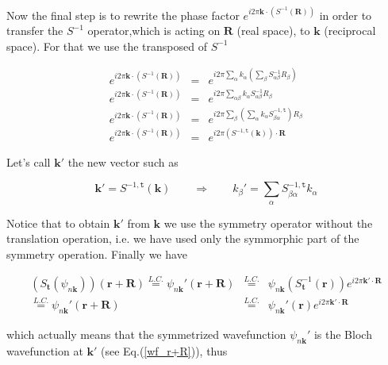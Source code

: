 \documentclass[a4paper,12pt]{report}
\begin{document}
Now the final step is to rewrite the phase factor $e^{i2\pi\mathbf{k}\cdotp\left(S^{-1}\left(\mathbf{R}\right)\right)}$ in order to transfer the $S^{-1}$ operator,which is acting on $\mathbf{R}$ (real space), to $\mathbf{k}$ (reciprocal space). For that we use the transposed of $S^{-1}$

\begin{eqnarray}
e^{i2\pi\mathbf{k}\cdotp\left(S^{-1}\left(\mathbf{R}\right)\right) } &=& e^{i2\pi \sum_{\alpha}k_{\alpha} \left(\sum_{\beta}S^{-1}_{\alpha\beta} R_{\beta}\right) } \nonumber \\
e^{i2\pi\mathbf{k}\cdotp\left(S^{-1}\left(\mathbf{R}\right)\right) } &=& e^{i2\pi \sum_{\alpha\beta}k_{\alpha} S^{-1}_{\alpha\beta} R_{\beta} } \nonumber \\
e^{i2\pi\mathbf{k}\cdotp\left(S^{-1}\left(\mathbf{R}\right)\right) } &=& e^{i2\pi \sum_{\beta} \left(\sum_{\alpha} k_{\alpha} S^{-1,\mathtt{t}}_{\beta\alpha}\right) R_{\beta} } \nonumber \\
e^{i2\pi\mathbf{k}\cdotp\left(S^{-1}\left(\mathbf{R}\right)\right) } &=& e^{i2\pi\left(S^{-1,\mathtt{t}}\left(\mathbf{k}\right)\right)\cdotp\mathbf{R} }
\end{eqnarray}

Let's call $\mathbf{k}'$ the new vector such as

\begin{equation}
\mathbf{k}' = S^{-1,\mathtt{t}}\left( \mathbf{k}\right)  \qquad \Rightarrow  \qquad k_{\beta}' = \sum_{\alpha} S_{\beta\alpha}^{-1,\mathtt{t}} k_{\alpha}
\end{equation}

Notice that to obtain $\mathbf{k}'$ from $\mathbf{k}$ we use the symmetry operator without the translation operation, i.e. we have used only the symmorphic part of the symmetry operation.
Finally we have

\begin{eqnarray}
\left( S_{\mathbf{t}} \left( \psi_{n\mathbf{k}}\right) \right) (\mathbf{r}+\mathbf{R}) \stackrel{L.C.}{=}  \psi_{n\mathbf{k}}'(\mathbf{r}+\mathbf{R}) &\stackrel{L.C.}{=}& \psi_{n\mathbf{k}}(S_{\mathbf{t}}^{-1}\left( \mathbf{r}\right)) e^{i2\pi\mathbf{k}'\cdotp\mathbf{R}} \nonumber\\
\stackrel{L.C.}{=} \psi_{n\mathbf{k}}'(\mathbf{r}+\mathbf{R}) &\stackrel{L.C.}{=}& \psi_{n\mathbf{k}}'(\mathbf{r}) e^{i2\pi\mathbf{k}'\cdotp\mathbf{R}}
\end{eqnarray}

which actually means that the symmetrized wavefunction $\psi_{n\mathbf{k}}'$ is the Bloch wavefunction at $\mathbf{k}'$ (see Eq.(\ref{wf_r+R})), thus
\end{document}
